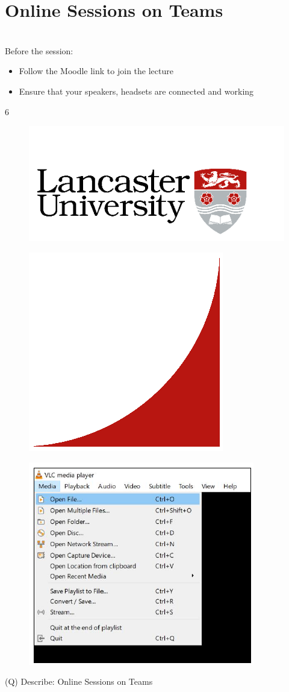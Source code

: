 \documentclass[12pt]{article}
\begin{document}
\section{Online Sessions on Teams}
\\
Before the session:\\
\begin{itemize}
  \item Follow the Moodle link to join the lecture
  \item Ensure that your speakers, headsets are connected and working
\end{itemize}
6\\
\begin{figure}[H]
\includegraphics[width=0.5\linewidth]{page1-image-1.png}
\end{figure}
\begin{figure}[H]
\includegraphics[width=0.5\linewidth]{page1-image-2.png}
\end{figure}
\begin{figure}[H]
\includegraphics[width=0.5\linewidth]{page1-image-3.png}
\end{figure}
\clearpage
(Q)
Describe: Online Sessions on Teams
\clearpage
\end{document}
